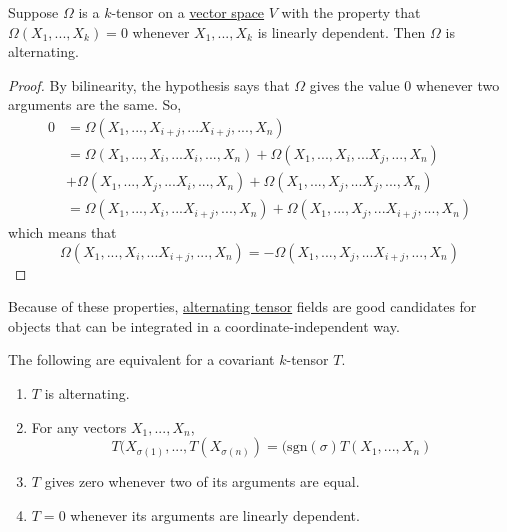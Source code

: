 \documentclass{article}
\newcounter{theorem}[section]
\begin{document}
    \begin{lemma}
      \label{thm:vanishing-on-repeated-arguments}
    Suppose $\Omega$ is a $k$-tensor on a \hyperref[lin-def:vector-space]{vector space} $V$ with the property that $\Omega(X_1, ..., X_k) = 0$ whenever $X_1, ..., X_k$ is linearly dependent. Then $\Omega$ is alternating.
    \end{lemma}
    \begin{proof}
    By bilinearity, the hypothesis says that $\Omega$ gives the value $0$ whenever two arguments are the same. So, 
    \begin{align*}
        0 & = \Omega(X_1, ..., X_{i+j}, ... X_{i+j}, ..., X_n)  \\
        & = \Omega(X_1, ..., X_{i}, ... X_{i}, ..., X_n) + \Omega(X_1, ..., X_{i}, ... X_{j}, ..., X_n) \\
        & + \Omega(X_1, ..., X_{j}, ... X_{i}, ..., X_n) + \Omega(X_1, ..., X_{j}, ... X_{j}, ..., X_n) \\
        & = \Omega(X_1, ..., X_{i}, ... X_{i+j}, ..., X_n) + \Omega(X_1, ..., X_{j}, ... X_{i+j}, ..., X_n)
    \end{align*}
    which means that 
    \begin{equation}
      \Omega(X_1, ..., X_{i}, ... X_{i+j}, ..., X_n) = - \Omega(X_1, ..., X_{j}, ... X_{i+j}, ..., X_n)
    \end{equation}
    \end{proof}

    Because of these properties, \hyperref[def:alternating-tensor]{alternating tensor} fields are good candidates for objects that can be integrated in a coordinate-independent way. 

    \begin{theorem}
      \label{thm:characterizations-of-alternating-tensors}
    The following are equivalent for a covariant $k$-tensor $T$. 
    \begin{enumerate}
        \item $T$ is alternating. 
        \item For any vectors $X_1, ..., X_n$, 
        \begin{equation}
          T(X_{\sigma(1)}, ..., T(X_{\sigma(n)}) = (\text{sgn}(\sigma) T(X_1, ..., X_n)
        \end{equation}
        \item $T$ gives zero whenever two of its arguments are equal. 
        \item $T = 0$ whenever its arguments are linearly dependent.
    \end{enumerate}
    \end{theorem}
\end{document}
